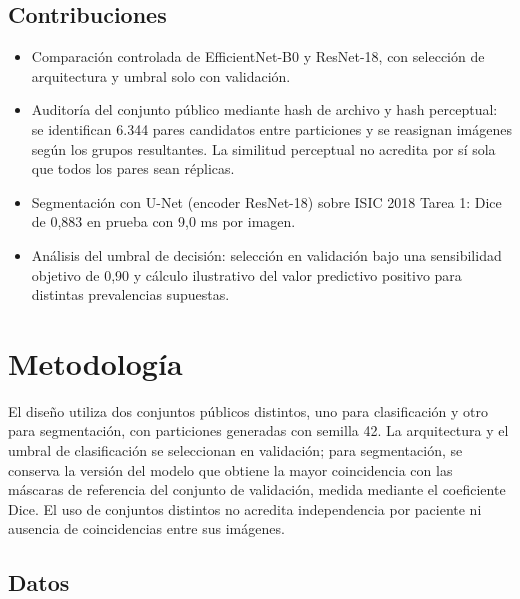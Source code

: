 \documentclass[conference]{IEEEtran}
\begin{document}
	\subsection{Contribuciones}
	
	\begin{itemize}
		\item Comparación controlada de EfficientNet-B0 y ResNet-18, con selección de arquitectura y umbral solo con validación.
		\item Auditoría del conjunto público mediante hash de archivo y hash perceptual: se identifican 6.344 pares candidatos entre particiones y se reasignan imágenes según los grupos resultantes. La similitud perceptual no acredita por sí sola que todos los pares sean réplicas.
		\item Segmentación con U-Net (encoder ResNet-18) sobre ISIC 2018 Tarea 1: Dice de 0,883 en prueba con 9,0 ms por imagen.
		\item Análisis del umbral de decisión: selección en validación bajo una sensibilidad objetivo de 0,90 y cálculo ilustrativo del valor predictivo positivo para distintas prevalencias supuestas.
	\end{itemize}
	
	\section{Metodología}
	
	El diseño utiliza dos conjuntos públicos distintos, uno para clasificación y otro para segmentación, con particiones generadas con semilla 42. La arquitectura y el umbral de clasificación se seleccionan en validación; para segmentación, se conserva la versión del modelo que obtiene la mayor coincidencia con las máscaras de referencia del conjunto de validación, medida mediante el coeficiente Dice. El uso de conjuntos distintos no acredita independencia por paciente ni ausencia de coincidencias entre sus imágenes.
	
	\subsection{Datos}
	
\end{document}
